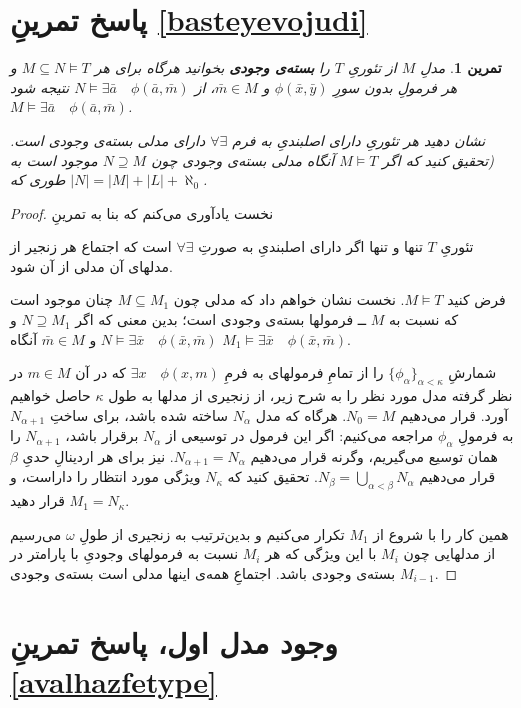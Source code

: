 \documentclass[12pt,a4paper]{report}
\theoremstyle{colorhead}
\newtheorem{tam}{تمرین}
\begin{document}
\section{پاسخ تمرینِ
\ref{basteyevojudi}}
\begin{tam}
مدلِ
$M$
از تئوریِ
$T$
را 
\textbf{بسته‌ی وجودی }
بخوانید
هرگاه برای هر
$M\subseteq N\models T$
و هر فرمولِ بدون سورِ
$\phi(\bar{x},\bar{y})$
و 
$\bar{m}\in M$،
از
$N\models \exists \bar{a}\quad \phi(\bar{a},\bar{m})$
نتیجه شود
$M\models \exists \bar{a}\quad \phi(\bar{a},\bar{m})$.
\par 
نشان دهید هر تئوریِ دارای اصلبندیِ به فرم
$\forall\exists$
دارای مدلی بسته‌ی وجودی است. (تحقیق کنید که اگر
$M\models T$
آنگاه مدلی
بسته‌ی وجودی 
 چون
$N\supseteq M$
موجود است به طوری که
$|N|=|M|+|L|+\aleph_0$.
\end{tam}
\begin{proof}
نخست یادآوری می‌کنم که بنا به تمرینِ

تئوریِ
$T$
تنها و تنها اگر دارای اصلبندیِ به صورتِ
$\forall\exists$
است  که اجتماع هر زنجیر از مدلهای آن مدلی از آن شود.
\par 
فرض کنید
$M\models T$.
نخست نشان خواهم داد که مدلی چون
$M\subseteq M_1$
چنان موجود است که 
نسبت به
$M$ ــ
فرمولها بسته‌ی وجودی است؛ بدین معنی که اگر
$N\supseteq M_1$
و
$N\models \exists \bar{x}\quad \phi(\bar{x},\bar{m})$
و
$\bar{m}\in M$
آنگاه 
$M_1\models \exists \bar{x}\quad \phi(\bar{x},\bar{m})$.
\par
شمارشِ
$\{\phi_\alpha\}_{\alpha<\kappa}$
را 
از تمامِ فرمولهای به فرمِ
$\exists x \quad \phi(x,m)$
 که در آن
$m\in M$
در نظر گرفته
مدل مورد نظر را به شرح زیر، از زنجیری از مدلها به طول
$\kappa$
 حاصل خواهیم آورد. 
 قرار می‌دهیم
$N_0=M$.
هرگاه که مدل
$N_\alpha$
ساخته شده باشد، برای ساختِ
$N_{\alpha+1}$
به فرمولِ
$\phi_\alpha$
مراجعه می‌کنیم: اگر این فرمول در توسیعی از
$N_\alpha$
برقرار باشد، 
$N_{\alpha+1} $
را همان توسیع می‌گیریم، وگرنه قرار می‌دهیم
$N_{\alpha+1}=N_\alpha$.
نیز برای هر اردینالِ
حدیِ
$\beta$
قرار می‌دهیم
$N_\beta=\bigcup _{\alpha<\beta} N_\alpha$.
تحقیق کنید که
$N_\kappa$
ویژگی مورد انتظار را داراست، و قرار دهید
$M_1=N_\kappa$.
\par 
همین کار را با شروع از
$M_1$
تکرار می‌کنیم و بدین‌ترتیب به زنجیری از طولِ
$\omega$
می‌رسیم از مدلهایی چون
$M_i$
با این ویژگی که هر
$M_i$
نسبت به فرمولهای وجودی‌ِ با پارامتر در
$M_{i-1}$
بسته‌ی وجودی باشد. اجتماعِ همه‌ی اینها مدلی است بسته‌ی وجودی. 
\end{proof}
\pagebreak 
\section*{وجود مدل اول، پاسخ تمرینِ \ref{avalhazfetype}}
\end{document}
